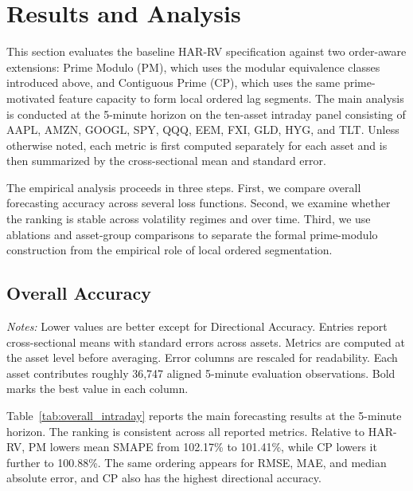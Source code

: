 ﻿\documentclass[11pt,a4paper]{article}
\begin{document}
\section{Results and Analysis}
\captionsetup{font=small,labelfont=bf,labelsep=period,hypcap=false}

\noindent
This section evaluates the baseline HAR-RV specification against two order-aware extensions: Prime Modulo (PM), which uses the modular equivalence classes introduced above, and Contiguous Prime (CP), which uses the same prime-motivated feature capacity to form local ordered lag segments. The main analysis is conducted at the 5-minute horizon on the ten-asset intraday panel consisting of AAPL, AMZN, GOOGL, SPY, QQQ, EEM, FXI, GLD, HYG, and TLT. Unless otherwise noted, each metric is first computed separately for each asset and is then summarized by the cross-sectional mean and standard error.

\noindent
The empirical analysis proceeds in three steps. First, we compare overall forecasting accuracy across several loss functions. Second, we examine whether the ranking is stable across volatility regimes and over time. Third, we use ablations and asset-group comparisons to separate the formal prime-modulo construction from the empirical role of local ordered segmentation.

\subsection{Overall Accuracy}

{\renewcommand{\thetable}{1A}
\begin{center}
\label{tab:overall_intraday}
\small
\renewcommand{\arraystretch}{1.15}
\setlength{\tabcolsep}{6pt}
\resizebox{0.98\textwidth}{!}{}

\vspace{0.1cm}
\footnotesize \parbox{0.92\textwidth}{\textit{Notes:} Lower values are better except for Directional Accuracy. Entries report cross-sectional means with standard errors across assets. Metrics are computed at the asset level before averaging. Error columns are rescaled for readability. Each asset contributes roughly 36,747 aligned 5-minute evaluation observations. Bold marks the best value in each column.}
\end{center}}

\noindent
Table~\ref{tab:overall_intraday} reports the main forecasting results at the 5-minute horizon. The ranking is consistent across all reported metrics. Relative to HAR-RV, PM lowers mean SMAPE from 102.17\% to 101.41\%, while CP lowers it further to 100.88\%. The same ordering appears for RMSE, MAE, and median absolute error, and CP also has the highest directional accuracy.
\end{document}
